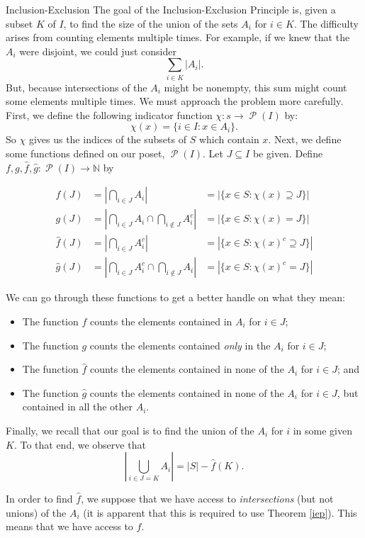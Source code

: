 \documentclass[12pt]{pom_thesis}
\DeclareMathOperator{\ps}{\mathscr{P}}
\newcommand{\Nn}{\mathbb{N}}
\begin{document}
\begin{chapter}{Inclusion-Exclusion}
The goal of the Inclusion-Exclusion Principle is, given a subset $K$ of $I$, to find the size of the union of the sets $A_i$ for $i \in K$. The difficulty arises from counting elements multiple times. For example, if we knew that the $A_i$ were disjoint, we could just consider
\[
\sum_{i \in K}\left|A_i\right|.
\]
But, because intersections of the $A_i$ might be nonempty, this sum might count some elements multiple times. We must approach the problem more carefully. First, we define the following indicator function $\chi: s \rightarrow \ps(I)$ by:
\[
\chi(x) = \{i \in I : x \in A_i\}.
\]
So $\chi$ gives us the indices of the subsets of $S$ which contain $x$.  
Next, we define some functions defined on our poset, $\ps(I)$.
Let $J \subseteq I$ be given. Define $f,g,\hat{f}, \hat{g}:\ps(I) \rightarrow \Nn$ by

\begin{align*}
f(J) &= \left| \bigcap_{i \in J} A_i\right| &= |\{x \in S: \chi(x) \supseteq J\}|\\
g(J) &= \left| \bigcap_{i \in J} A_i \cap \bigcap_{i \notin J} A_i^c\right| &= |\{x \in S: \chi(x) = J\}|\\
\hat{f}(J) &= \left| \bigcap_{i \in J} A_i^c\right| &= |\{x \in S: \chi(x)^c \supseteq J\}|\\
\hat{g}(J) &= \left|\bigcap_{i \in J} A_i^c \cap \bigcap_{i \notin J} A_i \right| &= |\{x \in S: \chi(x)^c = J\}|
\end{align*}

We can go through these functions to get a better handle on what they mean:
\begin{itemize}
\item The function $f$ counts the elements contained in $A_i$ for $i \in J$;
\item The function $g$ counts the elements contained \emph{only} in the $A_i$ for $i \in J$;
\item The function $\hat{f}$ counts the elements contained in none of the $A_i$ for $i \in J$; and
\item The function $\hat{g}$ counts the elements contained in none of the $A_i$ for $i \in J$, but contained in all the other $A_i$.
\end{itemize}
Finally, we recall that our goal is to find the union of the $A_i$ for $i$ in some given $K$. To that end, we observe that
\[
\left| \bigcup_{i \in J=K} A_i \right| = |S| - \hat{f}(K).
\]

In order to find $\hat{f}$, we suppose that we have access to \emph{intersections} (but not unions) of the $A_i$ (it is apparent that this is required to use Theorem \ref{iep}). This means that we have access to $f$. 


\end{chapter}
\end{document}
